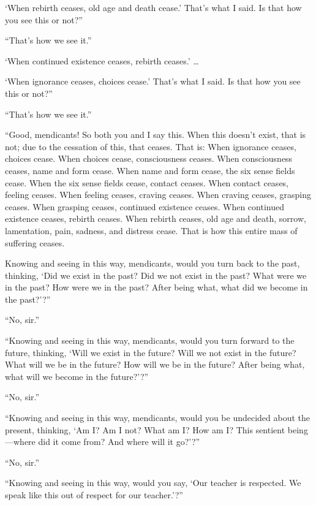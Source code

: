 \documentclass[12pt,openany]{book}%
\begin{document}
‘When rebirth ceases, old age and death cease.’ That’s what I said. Is that how you see this or not?” 

“That’s how we see it.” 

‘When continued existence ceases, rebirth ceases.’ … 

‘When ignorance ceases, choices cease.’ That’s what I said. Is that how you see this or not?” 

“That’s how we see it.” 

“Good, mendicants! So both you and I say this. When this doesn’t exist, that is not; due to the cessation of this, that ceases. That is: When ignorance ceases, choices cease. When choices cease, consciousness ceases. When consciousness ceases, name and form cease. When name and form cease, the six sense fields cease. When the six sense fields cease, contact ceases. When contact ceases, feeling ceases. When feeling ceases, craving ceases. When craving ceases, grasping ceases. When grasping ceases, continued existence ceases. When continued existence ceases, rebirth ceases. When rebirth ceases, old age and death, sorrow, lamentation, pain, sadness, and distress cease. That is how this entire mass of suffering ceases. 

Knowing and seeing in this way, mendicants, would you turn back to the past, thinking, ‘Did we exist in the past? Did we not exist in the past? What were we in the past? How were we in the past? After being what, what did we become in the past?’?” 

“No, sir.” 

“Knowing and seeing in this way, mendicants, would you turn forward to the future, thinking, ‘Will we exist in the future? Will we not exist in the future? What will we be in the future? How will we be in the future? After being what, what will we become in the future?’?” 

“No, sir.” 

“Knowing and seeing in this way, mendicants, would you be undecided about the present, thinking, ‘Am I? Am I not? What am I? How am I? This sentient being—where did it come from? And where will it go?’?” 

“No, sir.” 

“Knowing and seeing in this way, would you say, ‘Our teacher is respected. We speak like this out of respect for our teacher.’?” 
\end{document}
